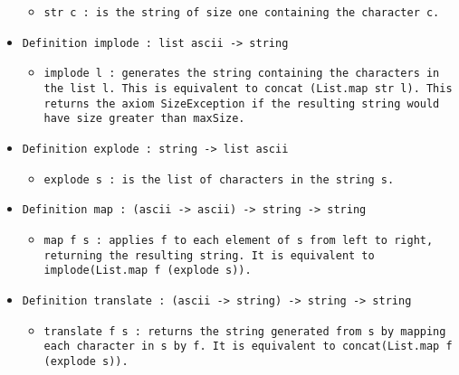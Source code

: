 \documentclass[11pt]{report}
\begin{document}
\begin{itemize}
\begin{itemize}
\item  \texttt{str c : is the string of size one containing the character c.}

\end{itemize}

\item  \texttt{Definition implode : list ascii -> string}

\begin{itemize}
\item \begin{flushleft} \texttt{implode l : generates the string containing the characters in the list l. This is equivalent to concat (List.map str l). This returns the axiom SizeException if the resulting string would have size greater than maxSize.} \end{flushleft}

\end{itemize}

\item  \texttt{Definition explode : string -> list ascii}

\begin{itemize}
\item  \texttt{explode s : is the list of characters in the string s.}

\end{itemize}

\item  \texttt{Definition map : (ascii -> ascii) -> string -> string}

\begin{itemize}
\item  \begin{flushleft} \texttt{map f s : applies f to each element of s from left to right, returning the resulting string. It is equivalent to implode(List.map f (explode s)).} \end{flushleft}

\end{itemize}

\item  \texttt{Definition translate : (ascii -> string) -> string -> string}

\begin{itemize}
\item  \begin{flushleft} \texttt{translate f s : returns the string generated from s by mapping each character in s by f. It is equivalent to concat(List.map f (explode s)).} \end{flushleft}


\end{itemize}
\end{itemize}
\end{document}
